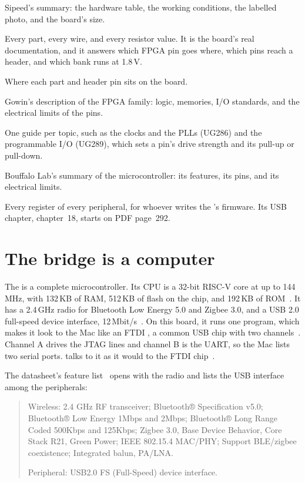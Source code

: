 \documentclass[11pt,a4paper]{article}
\newenvironment{datasheet}{\begin{quote}\small\sffamily}{\end{quote}}
\begin{document}
\begin{description}[style=nextline, leftmargin=1.5em]
  \item[Board datasheet~\cite{tnds}, 6 PDF pages] Sipeed’s summary: the hardware table, the working conditions, the labelled photo, and the board’s size.
  \item[Schematic~\cite{schematic}, 5 sheets] Every part, every wire, and every resistor value. It is the board’s real documentation, and it answers which FPGA pin goes where, which pins reach a header, and which bank runs at 1.8\,V.
  \item[Top designator drawing~\cite{topview}] Where each part and header pin sits on the board.
  \item[GW1NR datasheet~\cite{gw1nr}, 76 pages] Gowin’s description of the FPGA family: logic, memories, I/O standards, and the electrical limits of the pins.
  \item[Gowin user guides~\cite{gowin}] One guide per topic, such as the clocks and the PLLs (UG286) and the programmable I/O (UG289), which sets a pin’s drive strength and its pull-up or pull-down.
  \item[\name{BL702} datasheet~\cite{blds}, 54 pages] Bouffalo Lab’s summary of the microcontroller: its features, its pins, and its electrical limits.
  \item[\name{BL702} reference manual~\cite{blrm}, 339 pages] Every register of every peripheral, for whoever writes the ’s firmware. Its USB chapter, chapter~18, starts on PDF page~292.
\end{description}

\section*{The bridge is a computer}

The  is a complete microcontroller. Its CPU is a 32-bit RISC-V core at up to 144\,MHz, with 132\,KB of RAM, 512\,KB of flash on the chip, and 192\,KB of ROM~\cite[p.~2]{blds}. It has a 2.4\,GHz radio for Bluetooth Low Energy 5.0 and Zigbee 3.0, and a USB 2.0 full-speed device interface, 12\,Mbit/s~\cite[p.~2]{blds}. On this board, it runs one program, which makes it look to the Mac like an FTDI , a common USB chip with two channels~\cite{rvdebugger}. Channel A drives the JTAG lines and channel B is the UART, so the Mac lists two serial ports.  talks to it as it would to the FTDI chip~\cite{ofl}.

The datasheet’s feature list~\cite[PDF p.~2]{blds} opens with the radio and lists the USB interface among the peripherals:
\begin{datasheet}
Wireless: 2.4 GHz RF transceiver; Bluetooth® Specification v5.0; Bluetooth® Low Energy 1Mbps and 2Mbps; Bluetooth® Long Range Coded 500Kbps and 125Kbps; Zigbee 3.0, Base Device Behavior, Core Stack R21, Green Power; IEEE 802.15.4 MAC/PHY; Support BLE/zigbee coexistence; Integrated balun, PA/LNA.

Peripheral: USB2.0 FS (Full-Speed) device interface.
\end{datasheet}
\end{document}
